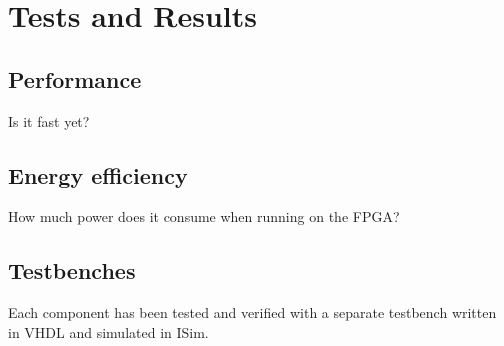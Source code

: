 \section{Tests and Results}


\subsection{Performance}

Is it fast yet?

\subsection{Energy efficiency}

How much power does it consume when running on the FPGA?

\subsection{Testbenches}

Each component has been tested and verified with a separate testbench written in VHDL and simulated in ISim.
